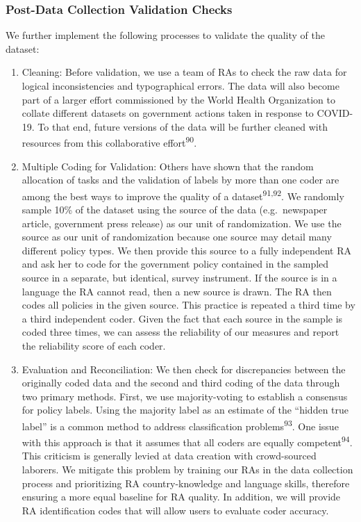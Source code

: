 \documentclass[]{article}
\begin{document}
\hypertarget{post-data-collection-validation-checks}{%
\subsubsection*{Post-Data Collection Validation Checks}\label{post-data-collection-validation-checks}}

We further implement the following processes to validate the quality of the dataset:

\begin{enumerate}
\def\labelenumi{\arabic{enumi}.}
\item
  Cleaning: Before validation, we use a team of RAs to check the raw data for logical inconsistencies and typographical errors. The data will also become part of a larger effort commissioned by the World Health Organization to collate different datasets on government actions taken in response to COVID-19. To that end, future versions of the data will be further cleaned with resources from this collaborative effort\textsuperscript{90}.
\item
  Multiple Coding for Validation: Others have shown that the random allocation of tasks and the validation of labels by more than one coder are among the best ways to improve the quality of a dataset\textsuperscript{91,92}. We randomly sample 10\% of the dataset using the source of the data (e.g.~newspaper article, government press release) as our unit of randomization. We use the source as our unit of randomization because one source may detail many different policy types. We then provide this source to a fully independent RA and ask her to code for the government policy contained in the sampled source in a separate, but identical, survey instrument. If the source is in a language the RA cannot read, then a new source is drawn. The RA then codes all policies in the given source. This practice is repeated a third time by a third independent coder. Given the fact that each source in the sample is coded three times, we can assess the reliability of our measures and report the reliability score of each coder.
\item
  Evaluation and Reconciliation: We then check for discrepancies between the originally coded data and the second and third coding of the data through two primary methods. First, we use majority-voting to establish a consensus for policy labels. Using the majority label as an estimate of the ``hidden true label'' is a common method to address classification problems\textsuperscript{93}. One issue with this approach is that it assumes that all coders are equally competent\textsuperscript{94}. This criticism is generally levied at data creation with crowd-sourced laborers. We mitigate this problem by training our RAs in the data collection process and prioritizing RA country-knowledge and language skills, therefore ensuring a more equal baseline for RA quality. In addition, we will provide RA identification codes that will allow users to evaluate coder accuracy.
\end{enumerate}
\end{document}
